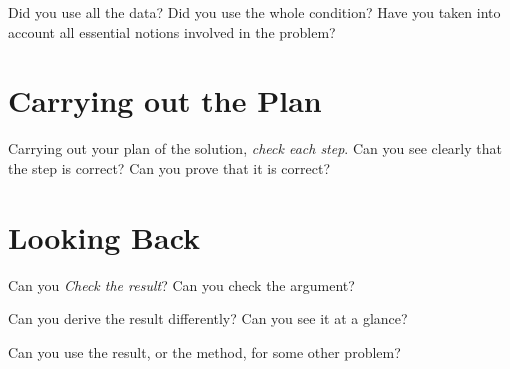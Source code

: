 \documentclass[11pt]{article}
\begin{document}
Did you use all the data?
Did you use the whole condition?
Have you taken into account all essential notions involved in the problem?

\section*{Carrying out the Plan}
Carrying out your plan of the solution, \emph{check each step}.
Can you see clearly that the step is correct?
Can you prove that it is correct?

\section*{Looking Back}
Can you \emph{Check the result}?
Can you check the argument?

Can you derive the result differently?
Can you see it at a glance?

Can you use the result, or the method, for some other problem?
\end{document}

